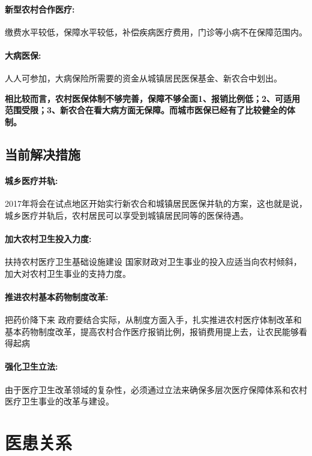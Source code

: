 \documentclass[11pt,twoside,a4paper]{article}
\begin{document}
		\paragraph{新型农村合作医疗:}
		缴费水平较低，保障水平较低，补偿疾病医疗费用，门诊等小病不在保障范围内。
		\paragraph{大病医保:}
		人人可参加，大病保险所需要的资金从城镇居民医保基金、新农合中划出。
		
		\textbf{相比较而言，农村医保体制不够完善，保障不够全面1、报销比例低；2、可适用范围受限；3、新农合在看大病方面无保障。而城市医保已经有了比较健全的体制。}
		
		\subsection{当前解决措施}
		\paragraph{城乡医疗并轨:}2017年将会在试点地区开始实行新农合和城镇居民医保并轨的方案，这也就是说，城乡医疗并轨后，农村居民可以享受到城镇居民同等的医保待遇。
		\paragraph{加大农村卫生投入力度:}扶持农村医疗卫生基础设施建设 国家财政对卫生事业的投入应适当向农村倾斜，加大对农村卫生事业的支持力度。
		\paragraph{推进农村基本药物制度改革:}把药价降下来 政府要结合实际，从制度方面入手，扎实推进农村医疗体制改革和基本药物制度改革，提高农村合作医疗报销比例，报销费用提上去，让农民能够看得起病
		\paragraph{强化卫生立法:}由于医疗卫生改革领域的复杂性，必须通过立法来确保多层次医疗保障体系和农村医疗卫生事业的改革与建设。
		
		\section{医患关系}
\end{document}
